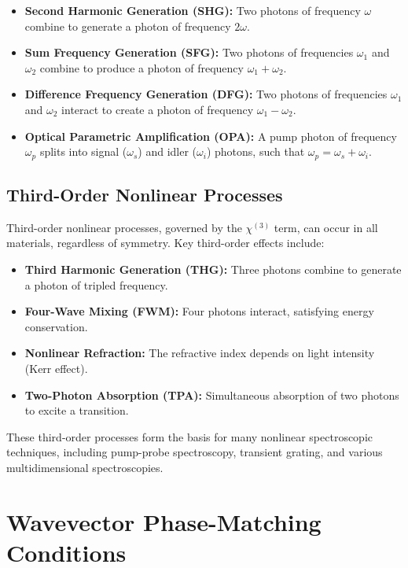 \begin{itemize}
	\item \textbf{Second Harmonic Generation (SHG):} Two photons of frequency $\omega$ combine to generate a photon of frequency $2\omega$.
	\item \textbf{Sum Frequency Generation (SFG):} Two photons of frequencies $\omega_1$ and $\omega_2$ combine to produce a photon of frequency $\omega_1 + \omega_2$.
	\item \textbf{Difference Frequency Generation (DFG):} Two photons of frequencies $\omega_1$ and $\omega_2$ interact to create a photon of frequency $\omega_1 - \omega_2$.
	\item \textbf{Optical Parametric Amplification (OPA):} A pump photon of frequency $\omega_p$ splits into signal ($\omega_s$) and idler ($\omega_i$) photons, such that $\omega_p = \omega_s + \omega_i$.
\end{itemize}

\subsection{Third-Order Nonlinear Processes}
\label{subsec:third_order}

\noindent Third-order nonlinear processes, governed by the $\chi^{(3)}$ term, can occur in all materials, regardless of symmetry. Key third-order effects include:

\begin{itemize}
	\item \textbf{Third Harmonic Generation (THG):} Three photons combine to generate a photon of tripled frequency.
	\item \textbf{Four-Wave Mixing (FWM):} Four photons interact, satisfying energy conservation.
	\item \textbf{Nonlinear Refraction:} The refractive index depends on light intensity (Kerr effect).
	\item \textbf{Two-Photon Absorption (TPA):} Simultaneous absorption of two photons to excite a transition.
\end{itemize}

\noindent These third-order processes form the basis for many nonlinear spectroscopic techniques, including pump-probe spectroscopy, transient grating, and various multidimensional spectroscopies.


\section{Wavevector Phase-Matching Conditions}
\label{sec:phase_matching}

